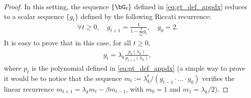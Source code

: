 \documentclass{article}
\theoremstyle{plain}
\theoremstyle{definition}
\theoremstyle{remark}
\begin{document}
\begin{proof}
  In this setting, the sequence $\{\bG_t\}$ defined in \eqref{eq:gt_def_appdx} reduces to a scalar sequence $\{g_t\}$ defined by the following Riccati recurrence:
  \begin{align*}
    \forall t\geqslant 0, \quad g_{t+1} = \frac{1}{1 - \frac{\beta}{\lambda_k^2} g_t}, \quad g_0 = 2.
  \end{align*}
  It is easy to prove that in this case, for all $t\geqslant 0$,
  \begin{align*}
    g_t = \lambda_k\frac{p_t(\lambda_k)}{p_{t+1}(\lambda_k)},
  \end{align*}
  where $p_t$ is the polynomial defined in \eqref{eq:pt_def_appdx} (a simple way to prove it would be to notice that the sequence $m_t := \lambda_k^t/(g_{t-1} \cdot\hdots\cdot g_0)$ verifies the linear recurrence $m_{t+1} = \lambda_k m_t - \beta m_{t-1}$, with $m_0=1$ and $m_1=\lambda_k/2$).
  

\end{proof}
\end{document}
